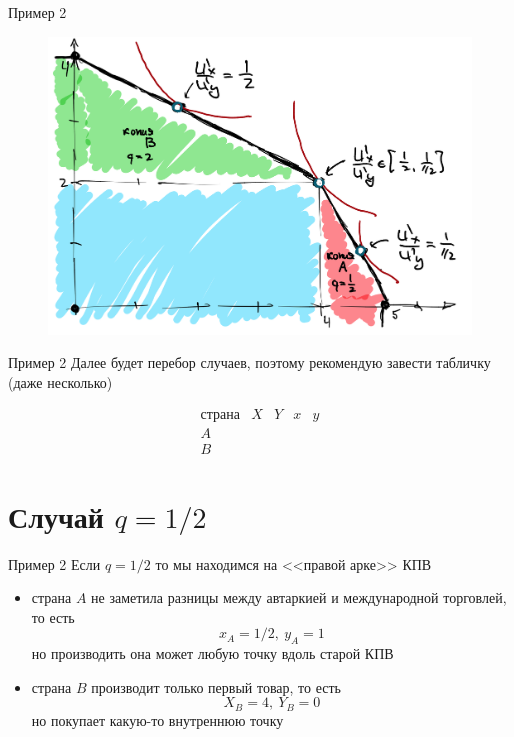 \documentclass{beamer}
\begin{document}
\begin{frame}{Пример 2}
\begin{figure}[hbt]
\centering
\includegraphics[width=1 \textwidth]{pic4.png}
\end{figure}
\end{frame}

\begin{frame}{Пример 2}
Далее будет перебор случаев, поэтому рекомендую завести табличку (даже несколько)

$$\begin{array}{c|c|c|c|c}
  \text{страна} & X & Y & x & y \\
  \hline
  A & & & &\\
  \hline
  B & & & &
\end{array}$$

\end{frame}

\section{Случай $q = 1/2$}

\begin{frame}{Пример 2}
Если $q = 1/2$ то мы находимся на <<правой арке>> КПВ
\begin{itemize}
  \item страна $A$ не заметила разницы между автаркией и международной торговлей, то есть $$x_A = 1/2, \ y_A = 1$$ но производить она может любую точку вдоль старой КПВ
  \item страна $B$ производит только первый товар, то есть
 $$X_B = 4, \ Y_B = 0$$
 но покупает какую-то внутреннюю точку
\end{itemize}
\end{frame}
\end{document}
